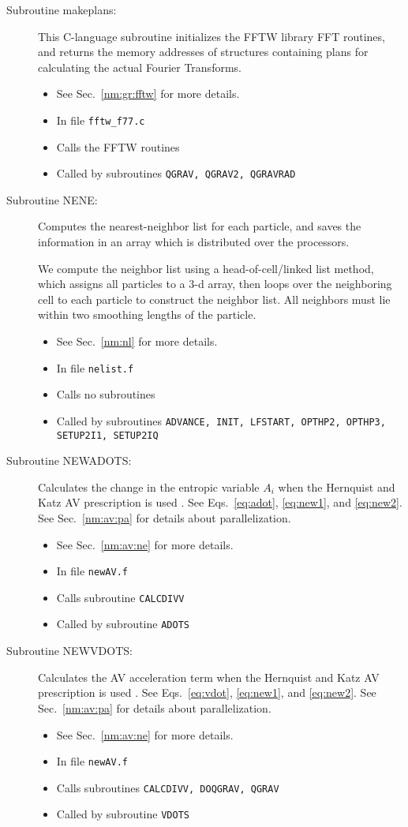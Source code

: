 \begin{description}
\item[Subroutine makeplans:] This C-language subroutine initializes
the FFTW library FFT routines, and returns the memory addresses of
structures containing plans for calculating the actual Fourier Transforms.
\begin{itemize} 
\item See Sec.~\ref{nm:gr:fftw} for more details.
\item In file {\tt fftw\_f77.c}
\item Calls the FFTW routines
\item Called by subroutines {\tt QGRAV, QGRAV2, QGRAVRAD}
\end{itemize} 

\item[Subroutine NENE:] Computes the nearest-neighbor list for each
particle, and saves  the information in an array which is distributed
over the processors. 

We compute the neighbor list using a head-of-cell/linked list method,
which assigns all particles to a 3-d array, then loops over the
neighboring cell to each particle to construct the neighbor list.  All
neighbors must lie within two smoothing lengths of the particle.
\begin{itemize} 
\item See Sec.~\ref{nm:nl} for more details.
\item In file {\tt nelist.f}
\item Calls no subroutines
\item Called by subroutines {\tt ADVANCE, INIT, LFSTART, OPTHP2, OPTHP3, 
SETUP2I1, SETUP2IQ}
\end{itemize}

\item[Subroutine NEWADOTS:]Calculates the change in the entropic variable
$A_i$ when the Hernquist and Katz AV prescription is used \citep{newAV}.  
See Eqs.~\ref{eq:adot}, \ref{eq:new1}, and \ref{eq:new2}.
See Sec.~\ref{nm:av:pa} for
details about parallelization.
\begin{itemize} 
\item See Sec.~\ref{nm:av:ne} for more details.
\item In file {\tt newAV.f}
\item Calls subroutine {\tt CALCDIVV}
\item Called by subroutine {\tt ADOTS}
\end{itemize}
  
\item[Subroutine NEWVDOTS:] Calculates the AV acceleration term 
when the Hernquist and Katz AV prescription is used \citep{newAV}.  
See Eqs.~\ref{eq:vdot}, \ref{eq:new1}, and \ref{eq:new2}.
See Sec.~\ref{nm:av:pa} for
details about parallelization.
\begin{itemize} 
\item See Sec.~\ref{nm:av:ne} for more details.
\item In file {\tt newAV.f}
\item Calls subroutines {\tt CALCDIVV, DOQGRAV, QGRAV}
\item Called by subroutine {\tt VDOTS}
\end{itemize}


\end{description}
